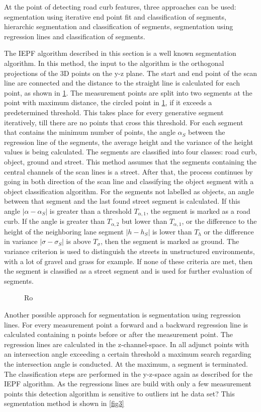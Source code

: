 \documentclass[conference]{IEEEtran}
\begin{document}
At the point of detecting road curb features, three approaches can be used: segmentation using iterative end point fit and classification of segments, hierarchic segmentation and classification of segments, segmentation using regression lines and classification of segments.

The IEPF algorithm described in this section is a well known segmentation algorithm. In this method, the input to the algorithm is the orthogonal projections of the 3D points on the y-z plane. The start and end point of the scan line are connected and the distance to the straight line is calculated for each point, as shown in \ref{fig2}. The measurement points are split into two segments at the point with maximum distance, the circled point in \ref{fig2}, if it exceeds a predetermined threshold. This takes place for every generative segment iteratively, till there are no points that cross this threshold. For each segment that contains the minimum number of points, the angle $\alpha_S$ between the regression line of the segments, the average height and the variance of the height values is being calculated. The segments are classified into four classes: road curb, object, ground and street. This method assumes that the segments containing the central channels of the scan lines is a street. After that, the process continues by going in both direction of the scan line and classifying the object segment with a object classification algorithm. For the segments not labelled as objects, an angle between that segment and the last found street segment is calculated. If this angle $|\alpha - \alpha_S|$ is greater than a threshold $T_{\alpha,1}$, the segment is marked as a road curb. If the angle is greater than $T_{\alpha,2}$ but lower than $T_{\alpha,1}$, or the difference to the height of the neighboring lane segment $|h - h_S|$ is lower than $T_h$ or the difference in variance $|\sigma - \sigma_S|$ is above $T_\sigma$, then the segment is marked as ground. The variance criterion is used to distinguish the streets in unstructured environments, with a lot of gravel and grass for example. If none of these criteria are met, then the segment is classified as a street segment and is used for further evaluation of segments. 

\begin{figure}[ht]
	\centering
	\caption{Ro}
	\label{fig2}
\end{figure}
 

Another possible approach for segmentation is segmentation using regression lines. For every measurement point a forward and a backward regression line is calculated containing n points before or after the measurement point. The regression lines are calculated in the z-channel-space.  In all adjunct points with an intersection angle exceeding a certain threshold a maximum search regarding the intersection angle is conducted. At the maximum, a segment is terminated. The classification steps are performed in the y-z-space again as described for the IEPF algorithm. As the regressions lines are build with only a few measurement points this detection algorithm is sensitive to outliers int he data set? This segmentation method is shown in \ref{fig3}
\end{document}
